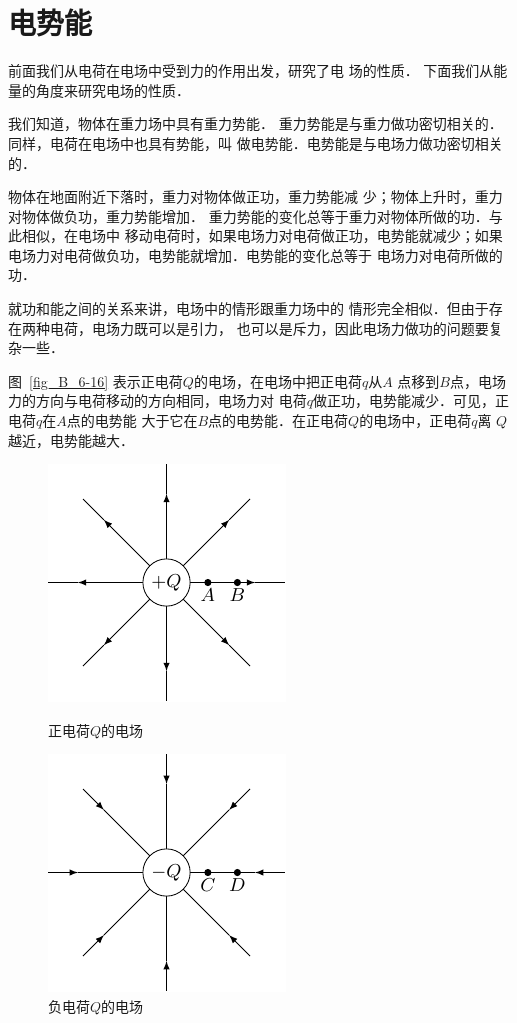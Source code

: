 \section{电势能}
前面我们从电荷在电场中受到力的作用出发，研究了电
场的性质．
下面我们从能量的角度来研究电场的性质．

我们知道，物体在重力场中具有重力势能．
重力势能是与重力做功密切相关的．
同样，电荷在电场中也具有势能，叫
做电势能．电势能是与电场力做功密切相关的．

物体在地面附近下落时，重力对物体做正功，重力势能减
少；物体上升时，重力对物体做负功，重力势能增加．
重力势能的变化总等于重力对物体所做的功．与此相似，在电场中
移动电荷时，如果电场力对电荷做正功，电势能就减少；如果
电场力对电荷做负功，电势能就增加．电势能的变化总等于
电场力对电荷所做的功．

就功和能之间的关系来讲，电场中的情形跟重力场中的
情形完全相似．但由于存在两种电荷，电场力既可以是引力，
也可以是斥力，因此电场力做功的问题要复杂一些．

图~\ref{fig_B_6-16} 表示正电荷$Q$的电场，在电场中把正电荷$q$从$A$
点移到$B$点，电场力的方向与电荷移动的方向相同，电场力对
电荷$q$做正功，电势能减少．可见，正电荷$q$在$A$点的电势能
大于它在$B$点的电势能．在正电荷$Q$的电场中，正电荷$q$离
$Q$越近，电势能越大．
\begin{figure}[htbp]
    \centering
    \begin{minipage}[t]{0.48\textwidth}
        \centering
        \includegraphics{fig/B/6-16.pdf}
        \caption{正电荷$Q$的电场}\label{fig_B_6-16}
    \end{minipage}
    \begin{minipage}[t]{0.48\textwidth}
        \centering
        \includegraphics{fig/B/6-17.pdf}
        \caption{负电荷$Q$的电场}\label{fig_B_6-17}
    \end{minipage}
\end{figure}

